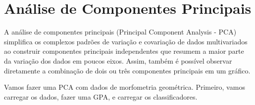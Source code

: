 \documentclass[
]{book}
\begin{document}
\section{Análise de Componentes Principais}\label{anuxe1lise-de-componentes-principais}

A análise de componentes principais (Principal Component Analysis - PCA) simplifica os complexos padrões de variação e covariação de dados multivariados ao construir componentes principais independentes que resumem a maior parte da variação dos dados em poucos eixos. Assim, também é possível observar diretamente a combinação de dois ou três componentes principais em um gráfico.

Vamos fazer uma PCA com dados de morfometria geométrica. Primeiro, vamos carregar os dados, fazer uma GPA, e carregar os classificadores.
\end{document}
